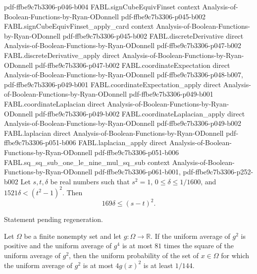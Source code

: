 \begin{theorem}
  {pdf-ffbe9c7b3306-p046-b004}
\proofstep
  {FABL.signCubeEquivFinset}
  {context}
  {Analysis-of-Boolean-Functions-by-Ryan-ODonnell}
  {pdf-ffbe9c7b3306-p045-b002}
\proofstep
  {FABL.signCubeEquivFinset_apply_card}
  {context}
  {Analysis-of-Boolean-Functions-by-Ryan-ODonnell}
  {pdf-ffbe9c7b3306-p045-b002}
\proofstep
  {FABL.discreteDerivative}
  {direct}
  {Analysis-of-Boolean-Functions-by-Ryan-ODonnell}
  {pdf-ffbe9c7b3306-p047-b002}
\proofstep
  {FABL.discreteDerivative_apply}
  {direct}
  {Analysis-of-Boolean-Functions-by-Ryan-ODonnell}
  {pdf-ffbe9c7b3306-p047-b002}
\proofstep
  {FABL.coordinateExpectation}
  {direct}
  {Analysis-of-Boolean-Functions-by-Ryan-ODonnell}
  {pdf-ffbe9c7b3306-p048-b007,
    pdf-ffbe9c7b3306-p049-b001}
\proofstep
  {FABL.coordinateExpectation_apply}
  {direct}
  {Analysis-of-Boolean-Functions-by-Ryan-ODonnell}
  {pdf-ffbe9c7b3306-p049-b001}
\proofstep
  {FABL.coordinateLaplacian}
  {direct}
  {Analysis-of-Boolean-Functions-by-Ryan-ODonnell}
  {pdf-ffbe9c7b3306-p049-b002}
\proofstep
  {FABL.coordinateLaplacian_apply}
  {direct}
  {Analysis-of-Boolean-Functions-by-Ryan-ODonnell}
  {pdf-ffbe9c7b3306-p049-b002}
\proofstep
  {FABL.laplacian}
  {direct}
  {Analysis-of-Boolean-Functions-by-Ryan-ODonnell}
  {pdf-ffbe9c7b3306-p051-b006}
\proofstep
  {FABL.laplacian_apply}
  {direct}
  {Analysis-of-Boolean-Functions-by-Ryan-ODonnell}
  {pdf-ffbe9c7b3306-p051-b006}
\proofstep
  {FABL.sq_sq_sub_one_le_nine_mul_sq_sub}
  {context}
  {Analysis-of-Boolean-Functions-by-Ryan-ODonnell}
  {pdf-ffbe9c7b3306-p061-b001,
    pdf-ffbe9c7b3306-p252-b002}
Let $s,t,\delta$ be real numbers such that $s^2=1$, $0\leq\delta\leq 1/1600$, and
$1521\delta<(t^2-1)^2$. Then
\[
169\delta\leq(s-t)^2.
\]
\end{theorem}

\begin{theorem}
\label{FABL.sq_sub_one_far_of_centered_far}
\leanok
{}
Statement pending regeneration.
\end{theorem}

\begin{theorem}
\label{FABL.one_div_144_le_uniformProbability_four_mul_sq_ge_secondMoment}
\leanok
{}
Let $\Omega$ be a finite nonempty set and let $g:\Omega\to\mathbb R$. If the uniform
average of $g^2$ is positive and the uniform average of $g^4$ is at most $81$ times the
square of the uniform average of $g^2$, then the uniform probability of the set of
$x\in\Omega$ for which the uniform average of $g^2$ is at most $4g(x)^2$ is at least
$1/144$.
\end{theorem}

